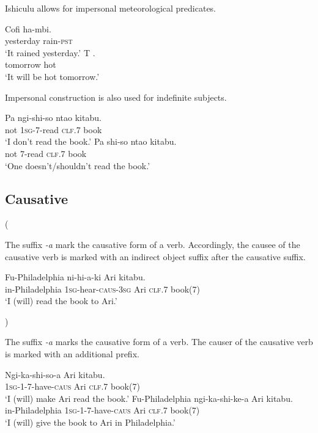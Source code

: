 Ishiculu allows for impersonal meteorological predicates.

\begin{exe}
\ex
\gll Cofi ha-mbi. \\
yesterday rain-\textsc{pst} \\
\trans `It rained yesterday.'
\ex
\gll T . \\
tomorrow hot \\
\trans `It will be hot tomorrow.'
\end{exe}

Impersonal construction is also used for indefinite subjects.

\begin{exe}
\ex
\gll Pa ngi-shi-so nta\textbeltl o kitabu. \\
not \textsc{1sg}-\textsc{7}-read \textsc{clf}.7 book \\
\trans `I don't read the book.'
\ex
\gll Pa shi-so nta\textbeltl o kitabu. \\
not \textsc{7}-read \textsc{clf}.7 book \\
\trans `One doesn't/shouldn't read the book.'
\end{exe}

\subsection{Causative}

(


The suffix \textit{-\textbeltl a} mark the causative form of a verb. Accordingly, the causee of the causative verb is marked with an indirect object suffix after the causative suffix.

\begin{exe}
\ex
\gll Fu-Philadelphia ni-hi-\textipa{\textbeltl}a-ki Ari  kitabu. \\
in-Philadelphia \textsc{1sg}-hear-\textsc{caus}-\textsc{3sg} Ari \textsc{clf}.7 book(7) \\
\trans `I (will) read the book to Ari.'
\end{exe}

)


The suffix \textit{-\textbeltl a} marks the causative form of a verb. The causer of the causative verb is marked with an additional prefix.

\begin{exe}
\ex
\gll Ngi-ka-shi-so-\textipa{\textbeltl}a Ari  kitabu. \\
\textsc{1sg}-\textsc{1}-\textsc{7}-have-\textsc{caus} Ari \textsc{clf}.7 book(7) \\
\trans `I (will) make Ari read the book.'
\ex
\gll Fu-Philadelphia ngi-ka-shi-ke-\textipa{\textbeltl}a Ari  kitabu. \\
in-Philadelphia \textsc{1sg}-\textsc{1}-\textsc{7}-have-\textsc{caus} Ari \textsc{clf}.7 book(7) \\
\trans `I (will) give the book to Ari in Philadelphia.'
\end{exe}


